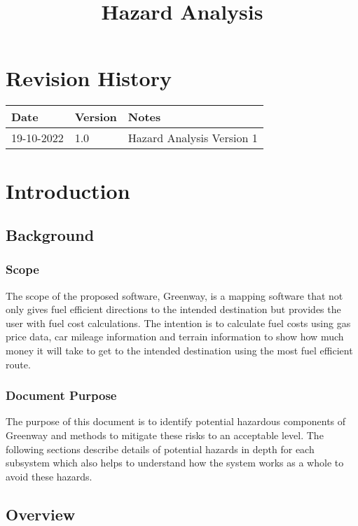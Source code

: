 \documentclass{article}
\title{Hazard Analysis\\\progname}
\author{\authname}
\date{}
\begin{document}
\maketitle

\newpage

\section*{Revision History}

\begin{tabularx}{\textwidth}{p{3cm}p{2cm}X}
\toprule {\bf Date} & {\bf Version} & {\bf Notes}\\
\midrule
19-10-2022 & 1.0 & Hazard Analysis Version 1\\
\bottomrule
\end{tabularx}

\newpage

\tableofcontents

\newpage

\section{Introduction}
\subsection{Background}
\subsubsection{Scope}
The scope of the proposed software, Greenway, is a mapping software that not only 
gives fuel efficient directions to the intended destination but provides the user with fuel cost calculations.
The intention is to calculate fuel costs using gas price data, car mileage information and terrain information
to show how much money it will take to get to the intended destination using the most fuel efficient route.

\subsubsection{Document Purpose}
The purpose of this document is to identify potential hazardous components of Greenway
and methods to mitigate these risks to an acceptable level. The following sections describe
details of potential hazards in depth for each subsystem which also helps to understand how
the system works as a whole to avoid these hazards.

\subsection{Overview}
\end{document}
